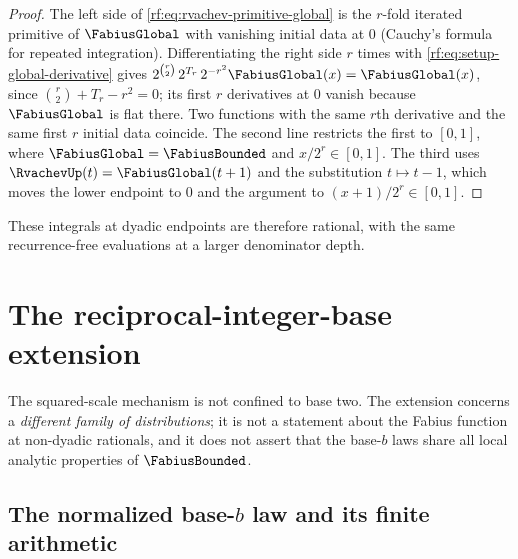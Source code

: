 \documentclass[11pt,oneside]{article}
\theoremstyle{plain}
\theoremstyle{definition}
\theoremstyle{remark}
\newcommand{\Fb}{\FabiusBounded}            %
\newcommand{\Fg}{\FabiusGlobal}             %
\newcommand{\up}{\RvachevUp}                %
\newcommand{\Tr}[1]{T_{#1}}                 %
\begin{document}
\begin{proof}
The left side of \cref{rf:eq:rvachev-primitive-global} is the $r$-fold
iterated primitive of $\Fg$ with vanishing initial data at $0$ (Cauchy's
formula for repeated integration).  Differentiating the right side $r$ times
with \cref{rf:eq:setup-global-derivative} gives
$2^{\binom{r}{2}}\,2^{\Tr{r}}\,2^{-r^{2}}\Fg(x)=\Fg(x)$, since
$\binom{r}{2}+\Tr{r}-r^{2}=0$; its first $r$ derivatives at $0$ vanish
because $\Fg$ is flat there.  Two functions with the same $r$th derivative
and the same first $r$ initial data coincide.  The second line restricts the
first to $[0,1]$, where $\Fg=\Fb$ and $x/2^{r}\in[0,1]$.  The third uses
$\up(t)=\Fg(t+1)$ and the substitution $t\mapsto t-1$, which moves the lower
endpoint to $0$ and the argument to $(x+1)/2^{r}\in[0,1]$.
\end{proof}

These integrals at dyadic endpoints are therefore rational, with the same
recurrence-free evaluations at a larger denominator depth.

\section{The reciprocal-integer-base extension}
\label{rf:sec:base}

The squared-scale mechanism is not confined to base two.  The extension
concerns a \emph{different family of distributions}; it is not a statement
about the Fabius function at non-dyadic rationals, and it does not assert
that the base-$b$ laws share all local analytic properties of $\Fb$.

\subsection{The normalized base-$b$ law and its finite arithmetic}
\label{rf:sec:base-law}
\end{document}
